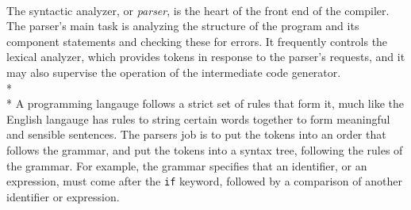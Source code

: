 \documentclass[12pt]{report}
\begin{document}
\\
The syntactic analyzer, or \textit{parser}, is the heart of the front end of the compiler.  The parser's main task is analyzing the structure of the program and its component statements and checking these for errors.  It frequently controls the lexical analyzer, which provides tokens in response to the parser's requests, and it may also supervise the operation of the intermediate code generator.\citep{compilerconstruction92}
\\*
\\*
A programming langauge follows a strict set of rules that form it, much like the English langauge has rules to string certain words together to form meaningful and sensible sentences.  The parsers job is to put the tokens into an order that follows the grammar, and put the tokens into a syntax tree, following the rules of the grammar.  For example, the grammar specifies that an identifier, or an expression, must come after the \texttt{if} keyword, followed by a comparison of another identifier or expression.
\end{document}
